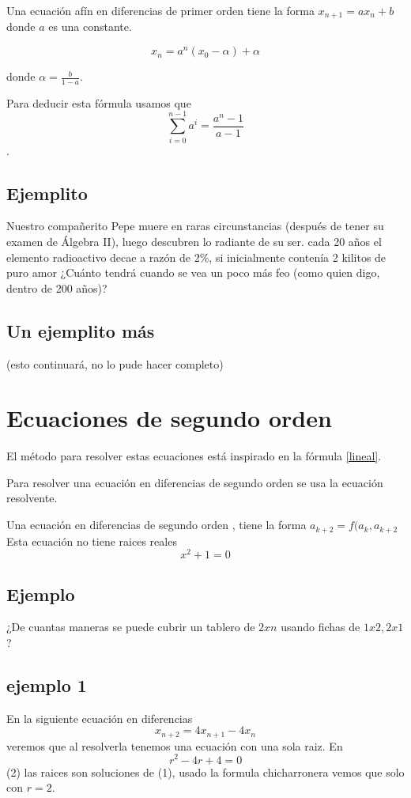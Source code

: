 \documentclass{article}
\begin{document}
Una ecuación afín en diferencias de primer orden tiene la forma $x_{n+1}=ax_n+b$ donde $a$ es una constante. 

\begin{equation}
  \label{afin}
  x_n=a^n(x_0-\alpha)+\alpha
\end{equation}

donde $\alpha=\frac{b}{1-a}$. 

Para deducir esta fórmula usamos que $$\sum_{i=0}^{n-1}a^i=\frac{a^n-1}{a-1}$$.

\subsection{Ejemplito}

Nuestro compañerito Pepe muere en raras circunstancias (después de tener su examen de Álgebra II), luego descubren lo radiante de su ser. cada 20 años el elemento radioactivo decae a razón de $2\%$, si inicialmente contenía 2 kilitos de puro amor ¿Cuánto tendrá cuando se vea un poco más feo (como quien digo, dentro de 200 años)?

\subsection{Un ejemplito más}

(esto continuará, no lo pude hacer completo)

\section{Ecuaciones de segundo orden}

El método para resolver estas ecuaciones está inspirado en la fórmula \ref{lineal}.

Para resolver una ecuación en diferencias de segundo orden se usa la ecuación resolvente.

Una ecuación en diferencias de segundo orden , tiene la forma $a_{k+2}=f(a_k ,a_{k+2}$
Esta ecuaci\'on no tiene raices reales $$x^2+1=0$$

\subsection{Ejemplo}

¿De cuantas maneras se puede cubrir un tablero de $2xn$ usando fichas de $1x2,2x1$?

\subsection{ejemplo 1}
En la siguiente ecuación en diferencias
\begin{equation}
  \label{eq:1}
  x_{n+2}=4x_{n+1}-4x_{n}
\end{equation}
 veremos que al resolverla tenemos una ecuación con una sola raiz.
En $$r^2-4r+4=0$$ (2) las raices son soluciones de (1), usado la formula chicharronera vemos que solo con $r=2$.
\end{document}
